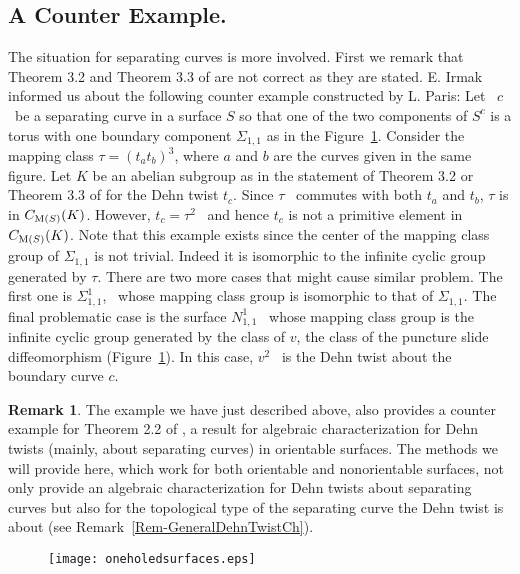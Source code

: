 \documentclass[11 pt]{amsart}
\theoremstyle{definition}
\newtheorem{Remark}[Theorem]{Remark}
\begin{document}
\subsection{A Counter Example.} The situation for separating curves is more involved.
First we remark that Theorem 3.2 and Theorem 3.3 of \cite{A} are not
correct as they are stated. E. Irmak informed us about the following
counter example constructed by L. Paris: Let \ $c$ \ be a separating
curve in a surface $S$ so that one of the two components of $S^c$ is
a torus with one boundary component $\Sigma_{1,1}$ as in the
Figure~\ref{oneholedsurfaces}. Consider the mapping class
$\tau=(t_at_b)^3$, where $a$ and $b$ are the curves given in the
same figure.  Let $K$ be an abelian subgroup as in the statement of
Theorem 3.2 or Theorem 3.3 of \cite{A} for the Dehn twist $t_c$.
Since $\tau$ \ commutes with both $t_a$ and $t_b$, $\tau$ is in
$C_{{\rm M}(S)}(K)$. However, $t_c=\tau^2$ \ and hence $t_c$ is not
a primitive element in $C_{{\rm M}(S)}(K)$. Note that this example
exists since the center of the mapping class group of $\Sigma_{1,1}$
is not trivial.  Indeed it is isomorphic to the infinite cyclic
group generated by $\tau$. There are two more cases that might cause
similar problem. The first one is $\Sigma_{1,1}^1$, \ whose mapping
class group is isomorphic to that of $\Sigma_{1,1}$. The final
problematic case is the surface $N_{1,1}^1$ \ whose mapping class
group is the infinite cyclic group generated by the class of $v$,
the class of the puncture slide diffeomorphism
(Figure~\ref{oneholedsurfaces}). In this case, $v^2$ \ is the Dehn
twist about the boundary curve $c$.

\begin{Remark}\label{IvnovThm2.2}
The example we have just described above, also provides a counter
example for Theorem 2.2 of \cite{I1}, a result for algebraic
characterization for Dehn twists (mainly, about separating curves)
in orientable surfaces. The methods we will provide here, which work
for both orientable and nonorientable surfaces, not only provide an
algebraic characterization for Dehn twists about separating curves
but also for the topological type of the separating curve the Dehn
twist is about (see Remark~\ref{Rem-GeneralDehnTwistCh}).
\end{Remark}

\begin{figure}[hbt]
 \begin{center}
 \texttt{[image: oneholedsurfaces.eps]}
\caption {} \label{oneholedsurfaces}
\end{center}
\end{figure}
\end{document}
